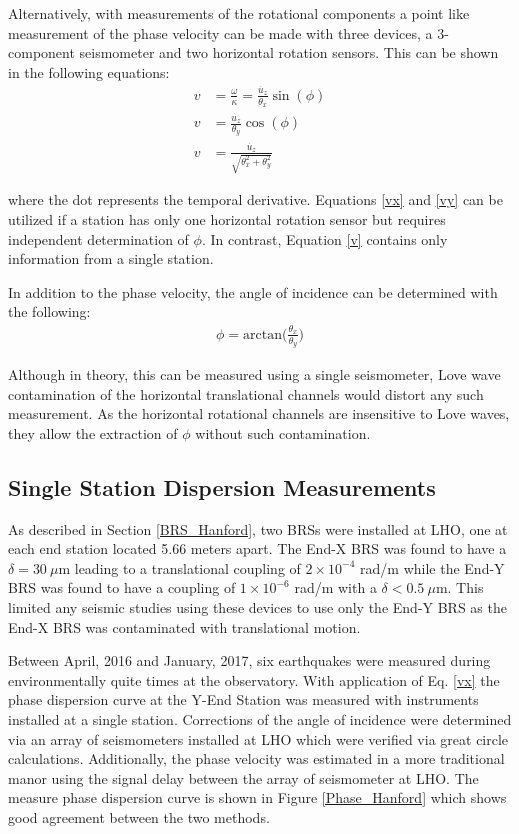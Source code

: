\documentclass [12pt, proquest]{uwthesis}[2019]
\begin{document}
Alternatively, with measurements of the rotational components a point like measurement of the phase velocity can be made with three devices, a 3-component seismometer and two horizontal rotation sensors. This can be shown in the following equations:
\begin{align} 
v&=\frac{\omega}{\kappa} = \frac{\dot{u_z}}{\theta_x}\sin(\phi) \label{vx} \\
v&=\frac{\dot{u_z}}{\theta_y}\cos(\phi)\label{vy} \\
v&=\frac{\dot{u_z}}{\sqrt{\theta_x^2+\theta_y^2}} \label{v}
\end{align}

where the dot represents the temporal derivative. Equations \ref{vx} and \ref{vy} can be utilized if a station has only one horizontal rotation sensor but requires independent determination of $\phi$. In contrast, Equation \ref{v} contains only information from a single station.

In addition to the phase velocity, the angle of incidence can be determined with the following:
\begin{align}
\phi=\text{arctan}\bigg(\frac{\theta_x}{\theta_y}\bigg)
\end{align}

Although in theory, this can be measured using a single seismometer, Love wave contamination of the horizontal translational channels would distort any such measurement. As the horizontal rotational channels are insensitive to Love waves, they allow the extraction of $\phi$ without such contamination.  

\subsection{Single Station Dispersion Measurements}
As described in Section \ref{BRS_Hanford}, two BRSs were installed at LHO, one at each end station located 5.66 meters apart. The End-X BRS was found to have a $\delta=30\ \mu \text{m}$ leading to a translational coupling of $2 \times 10^{-4}$ rad/m while the End-Y BRS was found to have a coupling of $1 \times 10^{-6}$ rad/m with a $\delta<0.5\ \mu \text{m}$. This limited any seismic studies using these devices to use only the End-Y BRS as the End-X BRS was contaminated with translational motion. 

Between April, 2016 and January, 2017, six earthquakes were measured during environmentally quite times at the observatory. \cite{tiltSeismology} With application of Eq. \ref{vx} the phase dispersion curve at the Y-End Station was measured with instruments installed at a single station. Corrections of the angle of incidence were determined via an array of seismometers installed at LHO which were verified via great circle calculations. Additionally, the phase velocity was estimated in a more traditional manor using the signal delay between the array of seismometer at LHO. The measure phase dispersion curve is shown in Figure \ref{Phase_Hanford} which shows good agreement between the two methods.
 
\end{document}
